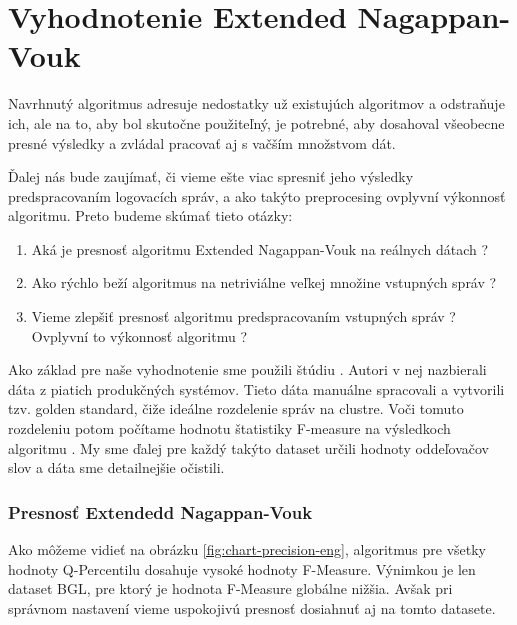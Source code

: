 \chapter{Vyhodnotenie Extended Nagappan-Vouk}
Navrhnutý algoritmus adresuje nedostatky už existujúch algoritmov a odstraňuje ich, ale na to, aby bol skutočne použiteľný, je potrebné, aby dosahoval všeobecne presné výsledky a zvládal pracovať aj s vačším množstvom dát. 

\par Ďalej nás bude zaujímať, či vieme ešte viac spresniť jeho výsledky predspracovaním logovacích správ, a ako takýto preprocesing ovplyvní výkonnosť algoritmu. Preto budeme skúmať tieto otázky:

\begin{enumerate}
  \item Aká je presnosť algoritmu Extended Nagappan-Vouk na reálnych dátach ?
  \item Ako rýchlo beží algoritmus na netriviálne veľkej množine vstupných správ ?
  \item Vieme zlepšiť presnosť algoritmu predspracovaním vstupných správ ? Ovplyvní to výkonnosť algoritmu ?
\end{enumerate}

Ako základ pre naše vyhodnotenie sme použili štúdiu \parencite{he2016}. Autori v nej nazbierali dáta z piatich produkčných systémov. Tieto dáta manuálne spracovali a vytvorili tzv. golden standard, čiže ideálne rozdelenie správ na clustre. Voči tomuto rozdeleniu potom počítame hodnotu štatistiky F-measure na výsledkoch algoritmu \parencite{goldenstandard}. My sme ďalej pre každý takýto dataset určili hodnoty oddeľovačov slov a dáta sme detailnejšie očistili.

\subsection{Presnosť Extendedd Nagappan-Vouk}
Ako môžeme vidieť na obrázku \ref{fig:chart-precision-eng}, algoritmus pre všetky hodnoty Q-Percentilu dosahuje vysoké hodnoty F-Measure. Výnimkou je len dataset BGL, pre ktorý je hodnota F-Measure globálne nižšia. Avšak pri správnom nastavení vieme uspokojivú presnosť dosiahnuť aj na tomto datasete.

